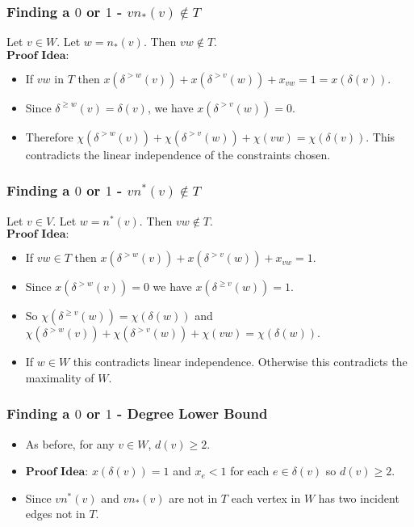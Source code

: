 \documentclass{beamer}
\begin{document}
\begin{frame}
\frametitle{Finding a $0$ or $1$ - $vn_*(v) \not\in T$}
Let $v \in W$.  Let $w = n_*(v)$. Then $vw \not\in T$.\\
$\textbf{Proof Idea:}$
\begin{itemize}
\item<2-> If $vw$ in $T$ then $x(\delta^{>w}(v)) + x(\delta^{>v}(w)) + x_{vw} = 1 = x(\delta(v))$.
\item<3-> Since $\delta^{\geq w}(v) = \delta(v)$, we have $x(\delta^{>v}(w)) = 0$.
\item<4-> Therefore $\chi(\delta^{>w}(v)) + \chi(\delta^{>v}(w)) + \chi(vw) = \chi(\delta(v))$. This contradicts the linear independence of the constraints chosen.
\end{itemize}
\end{frame}

\begin{frame}
\frametitle{Finding a $0$ or $1$ - $vn^*(v) \not\in T$}
 Let $v \in V$. Let $w = n^*(v)$. Then $vw \not\in T$.\\
 $\textbf{Proof Idea:}$
\begin{itemize}
\item<2-> If $vw \in T$ then $x(\delta^{>w}(v)) + x(\delta^{>v}(w)) + x_{vw} = 1$.
\item<3-> Since $x(\delta^{>w}(v)) = 0$ we have $x(\delta^{\geq v}(w)) = 1$.
\item<4-> So $\chi(\delta^{\geq v}(w)) = \chi(\delta(w))$ and $\chi(\delta^{>w}(v)) + \chi(\delta^{>v}(w)) + \chi(vw) = \chi(\delta(w)).$
\item<5-> If $w \in W$ this contradicts linear independence. Otherwise this contradicts the maximality of $W$.
\end{itemize}
\end{frame}

\begin{frame}
\frametitle{Finding a $0$ or $1$ - Degree Lower Bound}
\begin{itemize}
\item As before, for any $v \in W$, $d(v) \geq 2$.
\item $\textbf{Proof Idea:}$ $x(\delta(v)) = 1$ and $x_e < 1$ for each $e \in \delta(v)$ so $d(v) \geq 2$. 
\item Since $vn^*(v)$ and $vn_*(v)$ are not in $T$ each vertex in $W$ has two incident edges not in $T$.
\end{itemize}
\end{frame}
\end{document}
